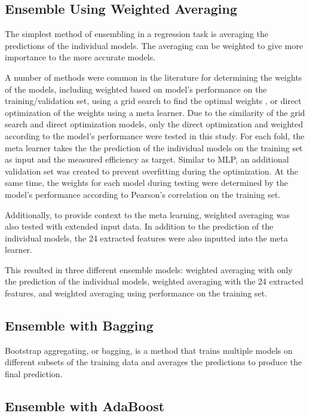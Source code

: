 \subsection{Ensemble Using Weighted Averaging}

The simplest method of ensembling in a regression task is averaging the predictions of the individual models. The averaging can be weighted to give more importance to the more accurate models. 

A number of methods were common in the literature for determining the weights of the models, including weighted based on model's performance on the training/validation set\cite{fathiImprovingPrecipitationForecasts2019}, using a grid search to find the optimal weights \cite{anandWeightedAverageEnsemble2023}, or direct optimization of the weights using a meta learner. Due to the similarity of the grid search and direct optimization models, only the direct optimization and weighted according to the model's performance were tested in this study. For each fold, the meta learner takes the the prediction of the individual models on the training set as input and the measured efficiency as target. Similar to MLP, an additional validation set was created to prevent overfitting during the optimization. At the same time, the weights for each model during testing were determined by the model's performance according to Pearson's correlation on the training set.

Additionally, to provide context to the meta learning, weighted averaging was also tested with extended input data. In addition to the prediction of the individual models, the 24 extracted features were also inputted into the meta learner. 

This resulted in three different ensemble models: weighted averaging with only the prediction of the individual models, weighted averaging with the 24 extracted features, and weighted averaging using performance on the training set.

\subsection{Ensemble with Bagging}

Bootstrap aggregating, or bagging, is a method that trains multiple models on different subsets of the training data and averages the predictions to produce the final prediction. 

\subsection{Ensemble with AdaBoost}

